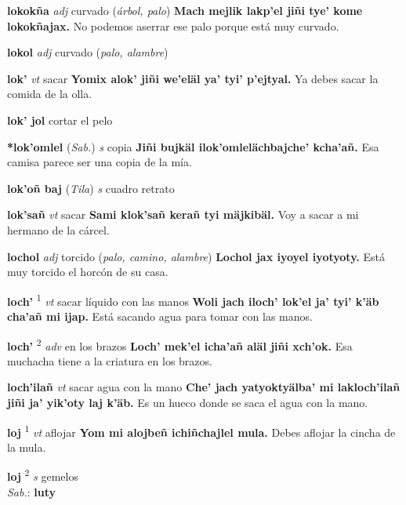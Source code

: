 \documentclass[10pt]{scrbook}
\newcommand{\entry}[1]{\textbf{#1}}
\newcommand{\defsuperscript}[1]{\textsuperscript{#1}}
\newcommand{\partofspeech}[1]{\textit{#1}}
\newcommand{\spanishtranslation}[1]{#1}
\newcommand{\clarification}[1]{(\textit{#1})}
\newcommand{\cholexample}[1]{\textbf{#1}}
\newcommand{\exampletranslation}[1]{#1}
\newcommand{\dialectvariant}[1]{\\\textit{#1}:}
\newcommand{\dialectword}[1]{\textbf{#1}}
\newcommand{\relevantdialect}[1]{(\textit{#1})}
\begin{document}
\begin{multicols}{2}
\entry{lokokña}
\partofspeech{adj}
\spanishtranslation{curvado}
\clarification{árbol, palo}
\cholexample{Mach mejlik lakp'el jiñi tye' kome lokokñajax.}
\exampletranslation{No podemos aserrar ese palo porque está muy curvado.}

\entry{lokol}
\partofspeech{adj}
\spanishtranslation{curvado}
\clarification{palo, alambre}

\entry{lok'}
\partofspeech{vt}
\spanishtranslation{sacar}
\cholexample{Yomix alok' jiñi we'eläl ya' tyi' p'ejtyal.}
\exampletranslation{Ya debes sacar la comida de la olla.}

\entry{lok' jol}
\spanishtranslation{cortar el pelo}

\entry{*lok'omlel}
\relevantdialect{Sab.}
\partofspeech{s}
\spanishtranslation{copia}
\cholexample{Jiñi bujkäl ilok'omlelächbajche' kcha'añ.}
\exampletranslation{Esa camisa parece ser una copia de la mía.}

\entry{lok'oñ baj}
\relevantdialect{Tila}
\partofspeech{s}
\spanishtranslation{cuadro}
\spanishtranslation{retrato}

\entry{lok'sañ}
\partofspeech{vt}
\spanishtranslation{sacar}
\cholexample{Sami klok'sañ kerañ tyi mäjkibäl.}
\exampletranslation{Voy a sacar a mi hermano de la cárcel.}

\entry{lochol}
\partofspeech{adj}
\spanishtranslation{torcido}
\clarification{palo, camino, alambre}
\cholexample{Lochol jax iyoyel iyotyoty.}
\exampletranslation{Está muy torcido el horcón de su casa.}

\entry{loch'}
\defsuperscript{1}
\partofspeech{vt}
\spanishtranslation{sacar líquido con las manos}
\cholexample{Woli jach iloch' lok'el ja' tyi' k'äb cha'añ mi ijap.}
\exampletranslation{Está sacando agua para tomar con las manos.}

\entry{loch'}
\defsuperscript{2}
\partofspeech{adv}
\spanishtranslation{en los brazos}
\cholexample{Loch' mek'el icha'añ aläl jiñi xch'ok.}
\exampletranslation{Esa muchacha tiene a la criatura en los brazos.}

\entry{loch'ilañ}
\partofspeech{vt}
\spanishtranslation{sacar agua con la mano}
\cholexample{Che' jach yatyoktyälba' mi lakloch'ilañ jiñi ja' yik'oty laj k'äb.}
\exampletranslation{Es un hueco donde se saca el agua con la mano.}

\entry{loj}
\defsuperscript{1}
\partofspeech{vt}
\spanishtranslation{aflojar}
\cholexample{Yom mi alojbeñ ichiñchajlel mula.}
\exampletranslation{Debes aflojar la cincha de la mula.}

\entry{loj}
\defsuperscript{2}
\partofspeech{s}
\spanishtranslation{gemelos}
\dialectvariant{Sab.}
\dialectword{luty}


\end{multicols}
\end{document}
